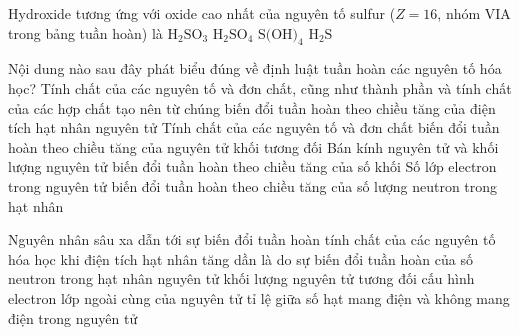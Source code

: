 \begin{ex}
    Hydroxide tương ứng với oxide cao nhất của nguyên tố sulfur ($Z = 16$, nhóm VIA trong bảng tuần hoàn) là
    \choice
    {$\text{H}_2\text{SO}_3$}
    {\True $\text{H}_2\text{SO}_4$}
    {$\text{S(OH)}_4$}
    {$\text{H}_2\text{S}$}
\end{ex}

\begin{ex}
    Nội dung nào sau đây phát biểu đúng về định luật tuần hoàn các nguyên tố hóa học?
    \choice
    {\True Tính chất của các nguyên tố và đơn chất, cũng như thành phần và tính chất của các hợp chất tạo nên từ chúng biến đổi tuần hoàn theo chiều tăng của điện tích hạt nhân nguyên tử}
    {Tính chất của các nguyên tố và đơn chất biến đổi tuần hoàn theo chiều tăng của nguyên tử khối tương đối}
    {Bán kính nguyên tử và khối lượng nguyên tử biến đổi tuần hoàn theo chiều tăng của số khối}
    {Số lớp electron trong nguyên tử biến đổi tuần hoàn theo chiều tăng của số lượng neutron trong hạt nhân}
\end{ex}

\begin{ex}
    Nguyên nhân sâu xa dẫn tới sự biến đổi tuần hoàn tính chất của các nguyên tố hóa học khi điện tích hạt nhân tăng dần là do sự biến đổi tuần hoàn của
    \choice
    {số neutron trong hạt nhân nguyên tử}
    {khối lượng nguyên tử tương đối}
    {\True cấu hình electron lớp ngoài cùng của nguyên tử}
    {tỉ lệ giữa số hạt mang điện và không mang điện trong nguyên tử}
\end{ex}

